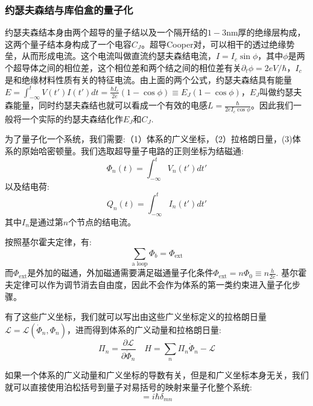 \documentclass[supercite]{HustGraduPaper}
\begin{document}
   \subsubsection{约瑟夫森结与库伯盒的量子化}
   	约瑟夫森结本身由两个超导的量子结以及一个隔开结的$1-3$nm厚的绝缘层构成，这两个量子结本身构成了一个电容$C_J$。超导Cooper对，可以相干的透过绝缘势垒，从而形成电流。这个电流叫做直流约瑟夫森结电流，$I = I_c \sin \phi$，其中$\phi$是两个超导体之间的相位差，这个相位差和两个结之间的相位差有关$\partial_t \phi = 2eV/\hbar$，$I_c$是和绝缘材料性质有关的特征电流\cite{Makhlin2001quantum}。由上面的两个公式，约瑟夫森结具有能量$E = \int_{-\infty}^{t} V(t')I(t')dt = \frac{\hbar I_c}{2e}(1-\cos \phi) \equiv E_J (1-\cos\phi)$，$E_J$叫做约瑟夫森能量，同时约瑟夫森结也就可以看成一个有效的电感$L = \frac{\hbar}{2eI_c \cos \phi}$。因此我们一般将一个实际的约瑟夫森结化作$E_J$和$C_J$.\cite{you2003quantum}
   	
   	
   
   	为了量子化一个系统，我们需要:（1）体系的广义坐标，（2）拉格朗日量，(3)体系的原始哈密顿量。我们选取超导量子电路的正则坐标为结磁通:
   	\begin{equation}
   	\Phi_n(t) = \int_{-\infty}^t V_n(t')dt'
   	\end{equation}
   	以及结电荷:
   	   	\begin{equation}
   	Q_n(t) = \int_{-\infty}^t I_n(t')dt'
   	\end{equation}
   	其中$I_n$是通过第$n$个节点的结电流。
   	
   	按照基尔霍夫定律，有:
   	\begin{equation}
   	\sum_{\text{a loop}} \Phi_b = \Phi_{\text{ext}}
   	\end{equation}
   	而$\Phi_{\text{ext}}$是外加的磁通，外加磁通需要满足磁通量子化条件$\Phi_{\text{ext}} = n \Phi_0 \equiv n\frac{h}{2e}$.
   	基尔霍夫定律可以作为调节消去自由度，因此不会作为体系的第一类约束进入量子化步骤。
   	
   	有了这些广义坐标，我们就可以写出由这些广义坐标定义的拉格朗日量$\mathcal{L} = \mathcal{L}(\dot{\Phi}_n, \Phi_n)$，进而得到体系的广义动量和拉格朗日量:
   	\begin{equation}
   	\Pi_n = \frac{\partial \mathcal{L}}{\partial \dot{\Phi}_n} \quad H = \sum_n \Pi_n \dot{\Phi}_n - \mathcal{L}
   	\end{equation}
   	
   	如果一个体系的广义动量和广义坐标的导数有关，但是和广义坐标本身无关，我们就可以直接使用泊松括号到量子对易括号的映射来量子化整个系统:
   	\begin{equation}
   	[\Phi_m, \Pi_n] = i\hbar \delta_{mn}
   	\end{equation}
   	
\end{document}
